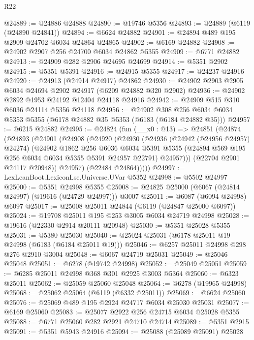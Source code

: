 \begin{lexlean}{R22}
\begin{coremodule}
@24889 := @24886 @24888
@24890 := @19746 @5356
@24893 := @24889 (@6119 (@24890 @24841))
@24894 := @6624 @24882
@24901 := @24894 @489 @195 @2909 @24702 @6034 @24864 @24865
@24902 := @6169 @24882
@24908 := @24902 @2907 @256 @24700 @6034 @24862 @5355
@24909 := @6771 @24882
@24913 := @24909 @282 @2906 @24695 @24699
@24914 := @5351 @2902
@24915 := @5351 @5391
@24916 := @24915 @5355
@24917 := @24237 @24916
@24920 := @24913 (@24914 @24917) @24862
@24930 := @24902 @2903 @2905 @6034 @24694 @2902 @24917 (@6209 @24882 @320 @2902)
@24936 := @24902 @2892 @1953 @24192 @12404 @24118 @24916
@24942 := @24909 @515 @310 @6036 @24114 @5356 @24118
@24956 := @24902
    @308
    @256
    @6034
    @6034
    @5353
    @5355
    (@6178 @24882 @35 @5353 (@6183 (@6184 @24882 @35)))
@24957 := @6215 @24882
@24995 := @24824
    (fun (__x0 : @13) =>
    @24851
      (@24874
        (@24893
          (@24901
            (@24908
              (@24920
                (@24930
                  (@24936
                    (@24942 (@24956 @24957) @24274)
                    (@24902
                      @1862
                      @256
                      @6036
                      @6034
                      @5391
                      @5355
                      (@24894 @569 @195 @256 @6034 @6034 @5355 @5391 @24957 @22791)
                      @24957)))
                (@22704 @2901 @24117 @20948))
              @24957)
            (@22484 @24864)))))
@24997 := LexLeanBoot.LexiconLse.Universe.UVar @5352
@24998 := @5502 @24997
@25000 := @5351 @24998 @5355
@25008 := @24825 @25000 (@6067 (@24814 @24997) (@19616 (@24729 @24997))) @3007
@25011 := @6087 (@6094 @24998) @6097
@25017 := @25008 @25011 @24844 (@6119 (@24847 @25000 @6097))
@25024 := @19708 @25011 @195 @253 @3005 @6034 @24719 @24998
@25028 := @19616 (@22330 @2914 @20111 @20948)
@25030 := @5351 @25028 @5355
@25031 := @5380 @25030
@25040 := @25024 @25031 (@6178 @25011 @19 @24998 (@6183 (@6184 @25011 @19)))
@25046 := @6257 @25011 @24998 @298 @276 @2910 @3004
@25048 := @6067 @24719 @25031
@25049 := @25046 @25048
@25051 := @6278 (@19742 @24998)
@25052 := @25049 @25051
@25059 := @6285 @25011 @24998 @368 @301 @2925 @3003 @5364
@25060 := @6323 @25011
@25062 := @25059 @25060 @25048
@25064 := @6278 (@19965 @24998)
@25068 := @25062 @25064 (@6119 (@6332 @25011))
@25069 := @6624 @25060
@25076 := @25069 @489 @195 @2924 @24717 @6034 @25030 @25031
@25077 := @6169 @25060
@25083 := @25077 @2922 @256 @24715 @6034 @25028 @5355
@25088 := @6771 @25060 @282 @2921 @24710 @24714
@25089 := @5351 @2915
@25091 := @5351 @5943 @24916
@25094 := @25088 (@25089 @25091) @25028

\end{coremodule}
\end{lexlean}
